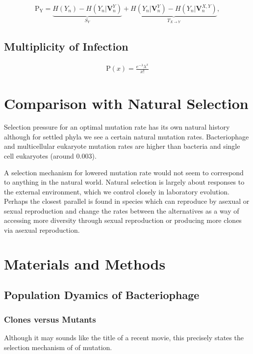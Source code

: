 \documentclass[10pt,letterpaper]{article}
\begin{document}
\begin{eqnarray}
\label{eq:schemeP}
	\mathrm{P_Y} = \underbrace{H(Y_n) - H(Y_n|\mathbf{V}^{Y}_{n})}_{S_Y} + \underbrace{H(Y_n|\mathbf{V}^{Y}_{n})- H(Y_n|\mathbf{V}^{X,Y}_{n})}_{T_{X\rightarrow Y}},
\end{eqnarray}

\subsection*{Multiplicity of Infection}

\vskip 0.2cm
\begin{eqnarray}
\label{eq:MOI}
\mathrm{P}\left( x \right) = \frac{{e^{ - \lambda } \lambda ^x }}{{x!}}
\end{eqnarray}

\section{Comparison with Natural Selection}
Selection pressure for an optimal mutation rate has its own natural history\cite{evomut} although for settled phyla we see a certain natural mutation rates.  Bacteriophage and multicellular eukaryote mutation rates are higher than bacteria and single cell eukaryotes (around 0.003).

A selection mechanism for lowered mutation rate would not seem to correspond to anything in the natural world.  Natural selection is largely about responses to the external environment, which we control closely in laboratory evolution.  Perhaps the closest parallel is found in species which can reproduce by asexual or sexual reproduction and change the rates between the alternatives as a way of accessing more diversity through sexual reproduction or producing more clones via asexual reproduction.


\section*{Materials and Methods}

\subsection*{Population Dyamics of Bacteriophage}
\subsubsection*{Clones versus Mutants}
Although it may sounds like the title of a recent movie, this precisely states the selection mechanism of of mutation.
\end{document}
